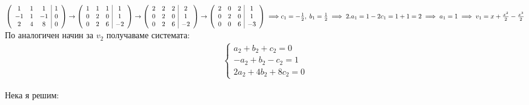 \documentclass[12pt]{article}
\begin{document}
$\left(\begin{array}{ccc|c}
     1 & 1 &  1 & 1 \\
    -1 & 1 & -1 & 0 \\
     2 & 4 &  8 & 0
\end{array}\right) \to \left(\begin{array}{ccc|c}
    1 & 1 & 1 &  1 \\
    0 & 2 & 0 &  1 \\
    0 & 2 & 6 & -2
\end{array}\right) \to \left(\begin{array}{ccc|c}
    2 & 2 & 2 &  2 \\
    0 & 2 & 0 &  1 \\
    0 & 2 & 6 & -2
\end{array}\right) \to \left(\begin{array}{ccc|c}
    2 & 0 & 2 &  1 \\
    0 & 2 & 0 &  1 \\
    0 & 0 & 6 & -3
\end{array}\right) \implies \\\\
c_1 = -\frac{1}{2}, \; b_1 = \frac{1}{2} \implies 2.a_1 = 1 - 2c_1 = 1 + 1 = 2 \implies a_1 = 1 \implies v_1 = x + \frac{x^2}{2} - \frac{x^3}{2}$ \\

По аналогичен начин за $v_2$ получаваме системата:
\begin{align*}
    \begin{cases}
         a_2 +  b_2 + c_2 = 0 \\
        -a_2 +  b_2 -  c_2 = 1 \\
        2a_2 + 4b_2 + 8c_2 = 0
    \end{cases}
\end{align*}

Нека я решим: \\
\end{document}
